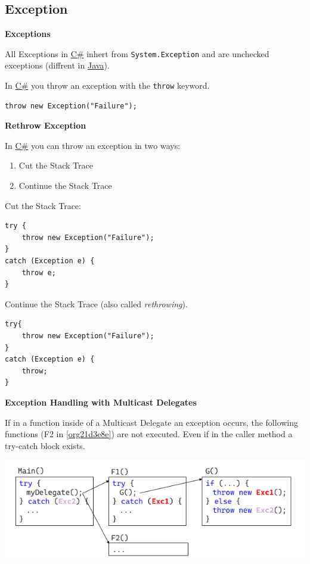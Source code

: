 \documentclass[11pt,twoside,landscape]{article}
\begin{document}
\begin{multicols}{3}
\section{Exception}
\label{sec:orgf467813}

\textbf{Exceptions}

All Exceptions in \href{../../../roam/20211003114158-c.org}{C\#} inhert from \texttt{System.Exception} and are unchecked exceptions (diffrent in \href{../../../roam/20201116150053-java.org}{Java}).

In \href{../../../roam/20211003114158-c.org}{C\#} you throw an exception with the \texttt{throw} keyword.
\lstset{language=csharp,label= ,caption= ,captionpos=b,numbers=none}
\begin{lstlisting}
throw new Exception("Failure");
\end{lstlisting}

\textbf{Rethrow Exception}

In \href{../../../roam/20211003114158-c.org}{C\#} you can throw an exception in two ways:
\begin{enumerate}
\item Cut the Stack Trace
\item Continue the Stack Trace
\end{enumerate}

Cut the Stack Trace:
\lstset{language=csharp,label= ,caption= ,captionpos=b,numbers=none}
\begin{lstlisting}
try {
    throw new Exception("Failure");
}
catch (Exception e) {
    throw e;
}
\end{lstlisting}

Continue the Stack Trace (also called \emph{rethrowing}).
\lstset{language=csharp,label= ,caption= ,captionpos=b,numbers=none}
\begin{lstlisting}
try{
    throw new Exception("Failure");
}
catch (Exception e) {
    throw;
}
\end{lstlisting}

\textbf{Exception Handling with Multicast Delegates}

If in a function inside of a Multicast Delegate an exception occurs, the following functions (F2 in \ref{org21d3e8e}) are not executed.
Even if in the caller method a try-catch block exists.

\begin{center}
\includegraphics[width=.9\linewidth]{img/exception_with_multicast.png}
\label{org21d3e8e}
\end{center}


\end{multicols}
\end{document}
